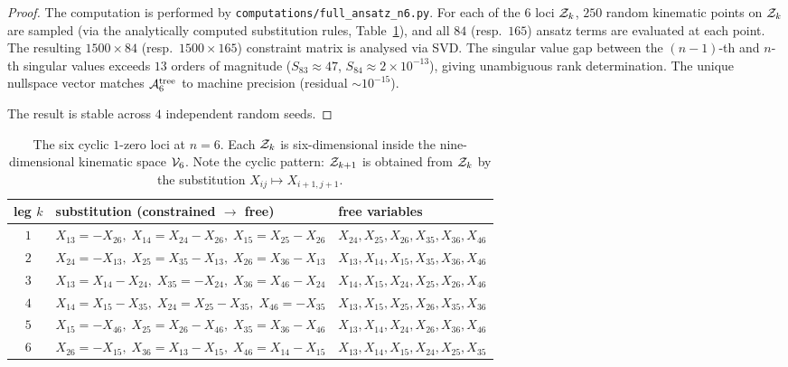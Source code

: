 \begin{proof}
The computation is performed by
\texttt{computations/full\_ansatz\_n6.py}. For each of the
$6$ loci $\mathcal{Z}_k$, $250$ random kinematic points on $\mathcal{Z}_k$
are sampled (via the analytically computed substitution
rules, Table~\ref{tab:loci6}), and all $84$ (resp.\ $165$)
ansatz terms are evaluated at each point. The resulting
$1500 \times 84$ (resp.\ $1500 \times 165$) constraint
matrix is analysed via SVD. The singular value gap between
the $(n{-}1)$-th and $n$-th singular values exceeds $13$
orders of magnitude ($S_{83} \approx 47$, $S_{84} \approx
2 \times 10^{-13}$), giving unambiguous rank determination.
The unique nullspace vector matches $\mathcal{A}_6^{\mathrm{tree}}$
to machine precision (residual $\sim 10^{-15}$).

The result is stable across $4$ independent random seeds.
\end{proof}

\begin{table}[h]
\centering
\small
\begin{tabular}{c|l|l}
\toprule
leg $k$ & substitution (constrained $\to$ free) & free variables \\
\midrule
$1$ & $X_{13}=-X_{26},\; X_{14}=X_{24}-X_{26},\; X_{15}=X_{25}-X_{26}$
    & $X_{24},X_{25},X_{26},X_{35},X_{36},X_{46}$ \\
$2$ & $X_{24}=-X_{13},\; X_{25}=X_{35}-X_{13},\; X_{26}=X_{36}-X_{13}$
    & $X_{13},X_{14},X_{15},X_{35},X_{36},X_{46}$ \\
$3$ & $X_{13}=X_{14}-X_{24},\; X_{35}=-X_{24},\; X_{36}=X_{46}-X_{24}$
    & $X_{14},X_{15},X_{24},X_{25},X_{26},X_{46}$ \\
$4$ & $X_{14}=X_{15}-X_{35},\; X_{24}=X_{25}-X_{35},\; X_{46}=-X_{35}$
    & $X_{13},X_{15},X_{25},X_{26},X_{35},X_{36}$ \\
$5$ & $X_{15}=-X_{46},\; X_{25}=X_{26}-X_{46},\; X_{35}=X_{36}-X_{46}$
    & $X_{13},X_{14},X_{24},X_{26},X_{36},X_{46}$ \\
$6$ & $X_{26}=-X_{15},\; X_{36}=X_{13}-X_{15},\; X_{46}=X_{14}-X_{15}$
    & $X_{13},X_{14},X_{15},X_{24},X_{25},X_{35}$ \\
\bottomrule
\end{tabular}
\caption{The six cyclic $1$-zero loci at $n=6$. Each $\mathcal{Z}_k$ is
six-dimensional inside the nine-dimensional kinematic space $\mathcal{V}_6$.
Note the cyclic pattern: $\mathcal{Z}_{k+1}$ is obtained from $\mathcal{Z}_k$ by the
substitution $X_{ij} \mapsto X_{i+1,j+1}$.}
\label{tab:loci6}
\end{table}

